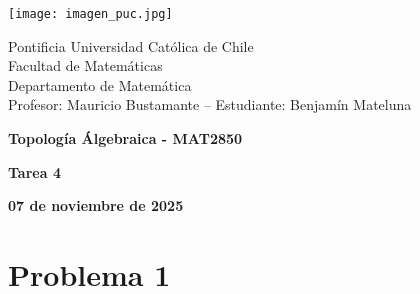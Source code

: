 \documentclass{article}
\begin{document}
\begin{minipage}{2.5cm}
    \texttt{[image: imagen\_puc.jpg]}
\end{minipage}
\begin{minipage}{14cm}
    {\sc Pontificia Universidad Católica de Chile\\
    Facultad de Matemáticas\\
    Departamento de Matemática\\
    Profesor: Mauricio Bustamante -- Estudiante: Benjamín Mateluna}
\end{minipage}
\vspace{1ex}

{\centerline{\bf Topología Álgebraica - MAT2850}
\centerline{\bf Tarea 4}}
\centerline{\bf 07 de noviembre de 2025}

\section*{Problema 1}
\end{document}
